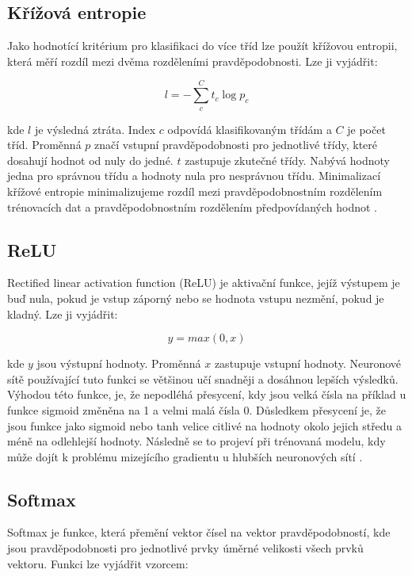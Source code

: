\documentclass[FM,BP]{tulthesis}
\begin{document}
\subsection{Křížová entropie}
Jako hodnotící kritérium pro klasifikaci do více tříd lze použít křížovou entropii, která měří rozdíl mezi dvěma rozděleními pravděpodobnosti. Lze ji vyjádřit:

\begin{equation}
\label{eqn:cross_entropy}
l = -{\sum_{c}^{C}t_{c}\log p_{c}}
\end{equation}

kde $ l $ je výsledná ztráta. Index $ c $ odpovídá klasifikovaným třídám a $ C $ je počet tříd. Proměnná $ p $ značí vstupní pravděpodobnosti pro jednotlivé třídy, které dosahují hodnot od nuly do jedné. $ t $ zastupuje zkutečné třídy. Nabývá hodnoty jedna pro správnou třídu a hodnoty nula pro nesprávnou třídu. Minimalizací křížové entropie minimalizujeme rozdíl mezi pravděpodobnostním rozdělením trénovacích dat a pravděpodobnostním rozdělením předpovídaných hodnot \cite{brownlee_2020}.

\subsection{ReLU}
Rectified linear activation function (ReLU) je aktivační funkce, jejíž výstupem je buď nula, pokud je vstup záporný nebo se hodnota vstupu nezmění, pokud je kladný. Lze ji vyjádřit:

\begin{equation}
\label{eqn:relu}
y = max(0, x)
\end{equation}

kde $ y $ jsou výstupní hodnoty. Proměnná $ x $ zastupuje vstupní hodnoty. Neuronové sítě používající tuto funkci se většinou učí snadněji a dosáhnou lepších výsledků. Výhodou této funkce, je, že nepodléhá přesycení, kdy jsou velká čísla na příklad u funkce sigmoid změněna na 1 a velmi malá čísla 0. Důsledkem přesycení je, že jsou funkce jako sigmoid nebo tanh velice citlivé na hodnoty okolo jejich středu a méně na odlehlejší hodnoty. Následně se to projeví při trénovaná modelu, kdy může dojít k problému mizejícího gradientu u hlubších neuronových sítí \cite{brownlee_2020_ReLU}.

\subsection{Softmax}
Softmax je funkce, která přemění vektor čísel na vektor pravděpodobností, kde jsou pravděpodobnosti pro jednotlivé prvky úměrné velikosti všech prvků vektoru. Funkci lze vyjádřit vzorcem:
\end{document}
